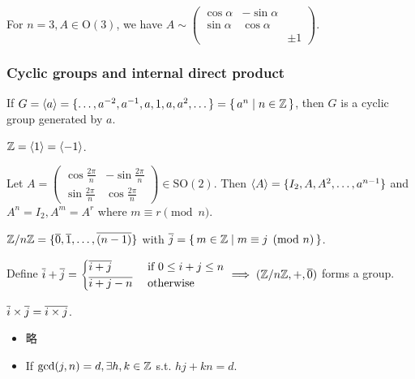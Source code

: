 For $n = 3, A \in \text{O}(3)$, we have $A \sim \begin{pmatrix}
  \cos\alpha & -\sin\alpha & \\
  \sin\alpha & \cos\alpha & \\
   & & \pm 1
\end{pmatrix}$.

\subsubsection{Cyclic groups and internal direct product}

\begin{definition}
  If $G = \langle a\rangle = \{ \dots, a^{-2}, a^{-1}, a, 1, a, a^2, \dots \}
  = \{\, a^n \mid n \in \mathbb{Z} \,\}$, then $G$ is a cyclic group generated by $a$.
\end{definition}

\begin{example}
  $\mathbb{Z} = \langle1\rangle = \langle-1\rangle$.
\end{example}

\begin{example}
  Let $A = \begin{pmatrix}
    \cos \frac{2\pi}{n} & -\sin \frac{2\pi}{n} \\ 
    \sin \frac{2\pi}{n} & \cos \frac{2\pi}{n}
  \end{pmatrix} \in \text{SO}(2)$. Then $\langle A\rangle =
  \{ I_2, A, A^2, \dots, a^{n-1} \}$ and $A^n = I_2, A^m = A^r$ where
  $m \equiv r \pmod n$.
\end{example}

\begin{example}
  ${\mathbb{Z}}/{n\mathbb{Z}} = \{ \overline{0}, \overline{1}, \dots, \overline{(n-1)} \}$ with
  $\overline{j} = \{\, m \in \mathbb{Z} \mid m \equiv j \pmod n \,\}$.

  Define $\overline{i} + \overline{j} = \begin{cases}
    \overline{i+j} & \text{~if~} 0 \le i + j \le n \\
    \overline{i+j-n} & \text{~otherwise}
  \end{cases} \implies ({\mathbb{Z}}/{n\mathbb{Z}}, +, \overline{0})$ forms a group.
\end{example}

\begin{remark}
  $\overline{i} \times \overline{j} = \overline{i \times j}$.
  \begin{itemize}
    \item 略
    \item If $\gcd(j, n) = d, \exists h, k \in \mathbb{Z}$ s.t. $hj + kn = d$.
  \end{itemize}
\end{remark}


